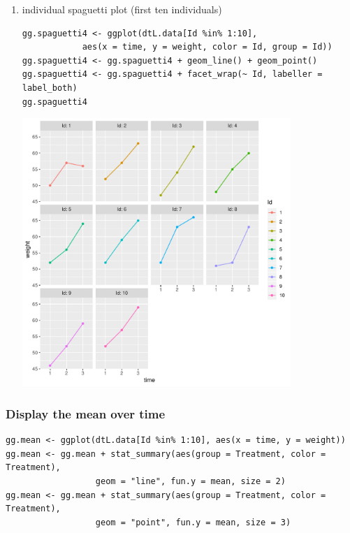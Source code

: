\documentclass{article}
\begin{document}
\begin{enumerate}
\clearpage

\item individual spaguetti plot (first ten individuals)
\label{sec:orgf4f7a59}

\lstset{language=r,label= ,caption= ,captionpos=b,numbers=none}
\begin{lstlisting}
gg.spaguetti4 <- ggplot(dtL.data[Id %in% 1:10], 
			aes(x = time, y = weight, color = Id, group = Id))
gg.spaguetti4 <- gg.spaguetti4 + geom_line() + geom_point()
gg.spaguetti4 <- gg.spaguetti4 + facet_wrap(~ Id, labeller = label_both) 
gg.spaguetti4
\end{lstlisting}

\begin{center}
\includegraphics[width=0.8\textwidth]{./figures/fig-spaguetti4.pdf}
\end{center}

\clearpage
\end{enumerate}

\subsubsection{Display the mean over time}
\label{sec:org8d82275}

\lstset{language=r,label= ,caption= ,captionpos=b,numbers=none}
\begin{lstlisting}
gg.mean <- ggplot(dtL.data[Id %in% 1:10], aes(x = time, y = weight))
gg.mean <- gg.mean + stat_summary(aes(group = Treatment, color = Treatment), 
				  geom = "line", fun.y = mean, size = 2)
gg.mean <- gg.mean + stat_summary(aes(group = Treatment, color = Treatment), 
				  geom = "point", fun.y = mean, size = 3)
\end{lstlisting}
\end{document}
